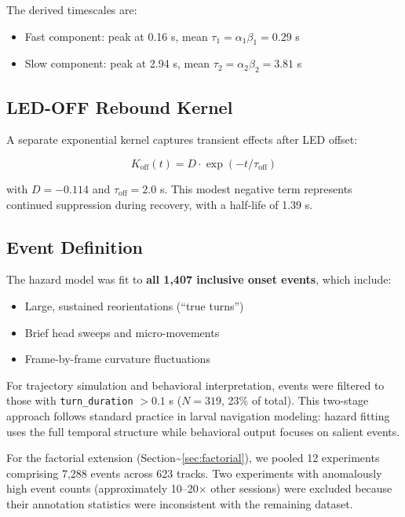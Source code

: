 \documentclass[
  11pt,
  letterpaper,
]{article}
\begin{document}
The derived timescales are:

\begin{itemize}
    \item Fast component: peak at 0.16 s, mean $\tau_1 = \alpha_1 \beta_1 = 0.29$ s
    \item Slow component: peak at 2.94 s, mean $\tau_2 = \alpha_2 \beta_2 = 3.81$ s
\end{itemize}

\subsection{LED-OFF Rebound Kernel}

A separate exponential kernel captures transient effects after LED
offset:

\begin{equation}
K_{\text{off}}(t) = D \cdot \exp(-t/\tau_{\text{off}})
\label{eq:rebound}
\end{equation}

\noindent with \(D = -0.114\) and \(\tau_{\text{off}} = 2.0\) s. This
modest negative term represents continued suppression during recovery,
with a half-life of 1.39 s.

\subsection{Event Definition}

The hazard model was fit to \textbf{all 1,407 inclusive onset events},
which include:

\begin{itemize}
    \item Large, sustained reorientations (``true turns'')
    \item Brief head sweeps and micro-movements
    \item Frame-by-frame curvature fluctuations
\end{itemize}

For trajectory simulation and behavioral interpretation, events were
filtered to those with \texttt{turn\_duration} \(> 0.1\) s (\(N = 319\),
23\% of total). This two-stage approach follows standard practice in
larval navigation modeling: hazard fitting uses the full temporal
structure while behavioral output focuses on salient events.

For the factorial extension
(Section\textasciitilde{}\ref{sec:factorial}), we pooled 12 experiments
comprising 7,288 events across 623 tracks. Two experiments with
anomalously high event counts (approximately 10--20\(\times\) other
sessions) were excluded because their annotation statistics were
inconsistent with the remaining dataset.
\end{document}
